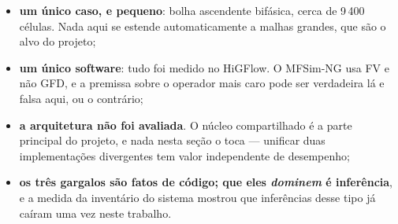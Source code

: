 \begin{itemize}
  \item \textbf{um \'unico caso, e pequeno}: bolha ascendente bif\'asica, cerca de
    9\,400 c\'elulas. Nada aqui se estende automaticamente a malhas grandes, que
    s\~ao o alvo do projeto;
  \item \textbf{um \'unico software}: tudo foi medido no HiGFlow. O MFSim-NG usa
    FV e n\~ao GFD, e a premissa sobre o operador mais caro pode ser verdadeira
    l\'a e falsa aqui, ou o contr\'ario;
  \item \textbf{a arquitetura n\~ao foi avaliada}. O n\'ucleo compartilhado \'e a
    parte principal do projeto, e nada nesta se\c{c}\~ao o toca --- unificar duas
    implementa\c{c}\~oes divergentes tem valor independente de desempenho;
  \item \textbf{os tr\^es gargalos s\~ao fatos de c\'odigo; que eles
    \emph{dominem} \'e infer\^encia}, e a medida da invent\'ario do sistema
    mostrou que infer\^encias desse tipo j\'a caíram uma vez neste trabalho.
\end{itemize}

